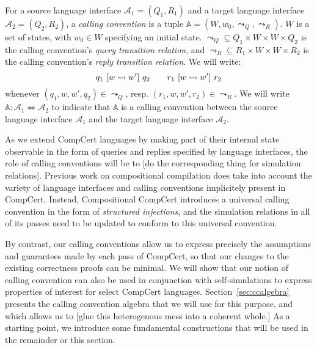 \begin{definition}
For a source language interface $\mathcal{A}_1 = (Q_1, R_1)$ and
a target language interface $\mathcal{A}_2 = (Q_2, R_2)$,
a \emph{calling convention}
is a tuple $\mathbb{A} = (W, w_0, \leadsto_Q, \leadsto_R)$.
$W$ is a set of states, with $w_0 \in W$ specifying an initial state.
${\leadsto_Q} \subseteq Q_1 \times W \times W \times Q_2$
is the calling convention's \emph{query transition relation}, and
${\leadsto_R} \subseteq R_1 \times W \times W \times R_2$
is the calling convention's \emph{reply transition relation}.
We will write:
\[ q_1 \ [{w \leadsto w'}]\  q_2 \qquad
   r_1 \ [{w \leadsto w'}]\  r_2 \]
whenever $(q_1, w, w', q_2) \in {\leadsto_Q}$,
resp. $(r_1, w, w', r_2) \in {\leadsto_R}$.
We will write $\mathbb{A} : \mathcal{A}_1 \Leftrightarrow \mathcal{A}_2$
to indicate that $\mathbb{A}$ is a calling convention between
the source language interface $\mathcal{A}_1$ and
the target language interface $\mathcal{A}_2$.
\end{definition}

As we extend CompCert languages
by making part of their internal state observable
in the form of queries and replies specified by language interfaces,
the role of calling conventions
will be to [do the corresponding thing for simulation relations].
Previous work on compositional compilation \cite{compcompcert}
does take into account the variety of language interfaces
and calling conventions implicitely present in CompCert.
Instead,
Compositional CompCert introduces a universal calling convention
in the form of \emph{structured injections},
and the simulation relations in all of its passes
need to be updated to conform to this universal convention.

By contrast,
our calling conventions
allow us to express precisely the assumptions and guarantees
made by each pass of CompCert,
so that our changes to the existing correctness proofs
can be minimal.
We will show that our notion of calling convention
can also be used in conjunction with self-simulations
to express properties of interest for
select CompCert languages.
Section~\ref{sec:ccalgebra}
presents the calling convention algebra that we will use
for this purpose, and
which allows us to [glue this heterogenous mess into a coherent whole.]
As a starting point,
we introduce some fundamental constructions that will be used
in the remainder or this section.

